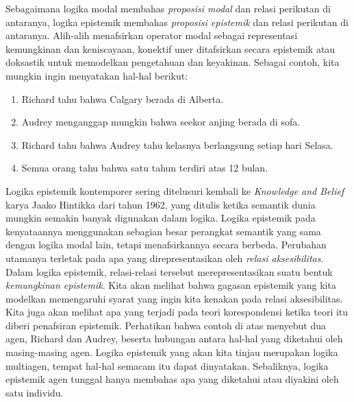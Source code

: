 \documentclass[../../../include/open-logic-section]{subfiles}
\begin{document}


Sebagaimana logika modal membahas \emph{proposisi modal} dan relasi perikutan
di antaranya, logika epistemik membahas \emph{proposisi epistemik} dan relasi
perikutan di antaranya. Alih-alih menafsirkan operator modal sebagai
representasi kemungkinan dan keniscayaan, konektif uner ditafsirkan secara
epistemik atau doksastik untuk memodelkan pengetahuan dan keyakinan. Sebagai
contoh, kita mungkin ingin menyatakan hal-hal berikut:

\begin{enumerate}
\item Richard tahu bahwa Calgary berada di Alberta.
\item Audrey menganggap mungkin bahwa seekor anjing berada di sofa.
\item Richard tahu bahwa Audrey tahu kelasnya berlangsung setiap hari Selasa.
\item Semua orang tahu bahwa satu tahun terdiri atas 12 bulan.
\end{enumerate}

Logika epistemik kontemporer sering ditelusuri kembali ke \emph{Knowledge and
Belief} karya Jaako Hintikka dari tahun 1962, yang ditulis ketika semantik
dunia mungkin semakin banyak digunakan dalam logika. Logika epistemik pada
kenyataannya menggunakan sebagian besar perangkat semantik yang sama dengan
logika modal lain, tetapi menafsirkannya secara berbeda. Perubahan utamanya
terletak pada apa yang direpresentasikan oleh \emph{relasi aksesibilitas}.
Dalam logika epistemik, relasi-relasi tersebut merepresentasikan suatu bentuk
\emph{kemungkinan epistemik}. Kita akan melihat bahwa gagasan epistemik yang
kita modelkan memengaruhi syarat yang ingin kita kenakan pada relasi
aksesibilitas. Kita juga akan melihat apa yang terjadi pada teori
korespondensi ketika teori itu diberi penafsiran epistemik. Perhatikan bahwa
contoh di atas menyebut dua agen, Richard dan Audrey, beserta hubungan antara
hal-hal yang diketahui oleh masing-masing agen. Logika epistemik yang akan
kita tinjau merupakan logika multiagen, tempat hal-hal semacam itu dapat
dinyatakan. Sebaliknya, logika epistemik agen tunggal hanya membahas apa yang
diketahui atau diyakini oleh satu individu.
\end{document}
